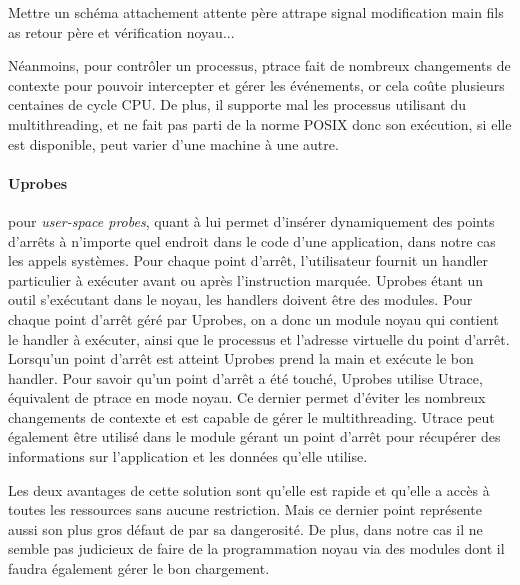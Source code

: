 {\color{red} Mettre un schéma attachement attente père attrape signal
  modification main fils as retour père et vérification noyau...}

Néanmoins, pour contrôler un processus, ptrace fait de nombreux changements de
contexte pour pouvoir intercepter et gérer les événements, or cela coûte
plusieurs centaines de cycle CPU. De plus, il supporte mal les processus
utilisant du multithreading, et ne fait pas parti de la norme POSIX donc son
exécution, si elle est disponible, peut varier d'une machine à une autre.

\paragraph{Uprobes}\citet{INTERCEPTION:AS, INTERCEPTION:MARION}

pour \textit{user-space probes}, quant à lui permet d'insérer dynamiquement des
points d'arrêts à n'importe quel endroit dans le code d'une application, dans
notre cas les appels systèmes. Pour chaque point d'arrêt, l’utilisateur fournit
un handler particulier à exécuter avant ou après l’instruction marquée. Uprobes
étant un outil s'exécutant dans le noyau, les handlers doivent être des
modules. Pour chaque point d'arrêt géré par Uprobes, on a donc un module noyau
qui contient le handler à exécuter, ainsi que le processus et l'adresse
virtuelle du point d'arrêt. Lorsqu'un point d'arrêt est atteint Uprobes prend la
main et exécute le bon handler. Pour savoir qu'un point d'arrêt a été touché,
Uprobes utilise Utrace, équivalent de ptrace en mode noyau. Ce dernier permet
d'éviter les nombreux changements de contexte et est capable de gérer le
multithreading. Utrace peut également être utilisé dans le module gérant un
point d'arrêt pour récupérer des informations sur l'application et les données
qu'elle utilise.

Les deux avantages de cette solution sont qu'elle est rapide et qu'elle a accès
à toutes les ressources sans aucune restriction. Mais ce dernier point
représente aussi son plus gros défaut de par sa dangerosité. De plus, dans notre
cas il ne semble pas judicieux de faire de la programmation noyau via des
modules dont il faudra également gérer le bon chargement.


